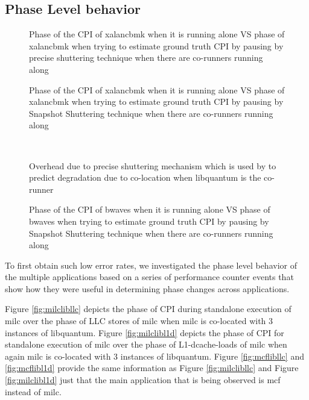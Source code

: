 \documentclass[pageno]{jpaper}
\begin{document}
\subsection{Phase Level behavior}
\label{subsec:PhaseLevelbehavior}
\begin{figure*}
\centering
\begin{minipage}[t]{1\columnwidth}
\centering
{}
\caption{Phase of the CPI of xalancbmk when it is running alone VS phase of xalancbmk when trying to estimate ground truth CPI by pausing by precise shuttering technique when there are co-runners running along}
\label{fig:xalshutter}
\end{minipage}
\hfill\begin{minipage}[t]{1\columnwidth}
\centering
{}
\caption{Phase of the CPI of xalancbmk when it is running alone VS phase of xalancbmk when trying to estimate ground truth CPI by pausing by Snapshot Shuttering technique when there are co-runners running along}
\label{fig:xalphase}
\end{minipage}
\hfill\\
\begin{minipage}[t]{1\columnwidth}
\centering
{}
\caption{Overhead due to precise shuttering mechanism which is used by \cite{fairpricing} to predict degradation due to co-location when libquantum is the co-runner \vspace{-15 mm}}
\label{fig:compareoverhead3}
\end{minipage}
\hfill
\begin{minipage}[t]{1\columnwidth}
\centering
{}
\caption{Phase of the CPI of bwaves when it is running alone VS phase of bwaves when trying to estimate ground truth CPI by pausing by Snapshot Shuttering technique when there are co-runners running along}
\label{fig:bwaveslib}
\end{minipage}
\end{figure*}

To first obtain such low error rates, we investigated the phase level behavior of the multiple applications based on a series of performance counter events that show how they were useful in determining phase changes across applications.

Figure \ref{fig:milclibllc} depicts the phase of CPI during standalone execution of milc over the phase of LLC stores of milc when milc is co-located with 3 instances of libquantum. Figure \ref{fig:milclibl1d} depicts the phase of CPI for standalone execution of milc over the phase of L1-dcache-loads of milc when again milc is co-located with 3 instances of libquantum. 
Figure \ref{fig:mcflibllc} and \ref{fig:mcflibl1d} provide the same information as Figure \ref{fig:milclibllc} and Figure \ref{fig:milclibl1d} just that the main application that is being observed is mcf instead of milc.
\end{document}
